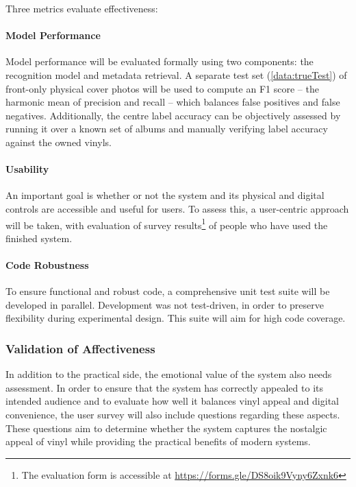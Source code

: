                 Three metrics evaluate effectiveness:
    
                \paragraph{Model Performance} Model performance will be evaluated formally using two components: the recognition model and metadata retrieval. A separate test set (\ref{data:trueTest}) of front-only physical cover photos will be used to compute an F1 score -- the harmonic mean of precision and recall -- which balances false positives and false negatives. Additionally, the centre label accuracy can be objectively assessed by running it over a known set of albums and manually verifying label accuracy against the owned vinyls.
    
                \paragraph{Usability} An important goal is whether or not the system and its physical and digital controls are accessible and useful for users. To assess this, a user-centric approach will be taken, with evaluation of survey results\footnote{The evaluation form is accessible at \href{https://forms.gle/DS8oik9Vyny6Zxnk6}{https://forms.gle/DS8oik9Vyny6Zxnk6}} of people who have used the finished system.
    
                \paragraph{Code Robustness} To ensure functional and robust code, a comprehensive unit test suite will be developed in parallel. Development was not test-driven, in order to preserve flexibility during experimental design. This suite will aim for high code coverage.
        
            \subsubsection{Validation of Affectiveness}
                
                In addition to the practical side, the emotional value of the system also needs assessment. In order to ensure that the system has correctly appealed to its intended audience and to evaluate how well it balances vinyl appeal and digital convenience, the user survey will also include questions regarding these aspects. These questions aim to determine whether the system captures the nostalgic appeal of vinyl while providing the practical benefits of modern systems.
    

